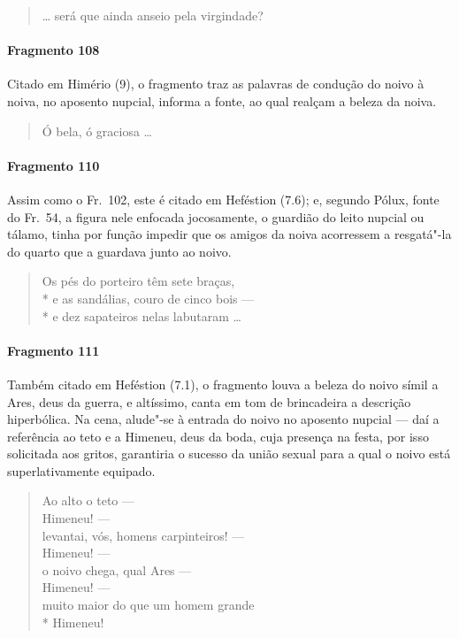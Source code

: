 \begin{verse}
\ldots{} será que ainda anseio pela virgindade?
\end{verse}

\paragraph{Fragmento 108}

{\small Citado em Himério (9), o fragmento traz as palavras de condução do noivo à noiva, no aposento nupcial, informa a fonte, ao qual realçam a beleza da noiva.}

\begin{verse}
Ó bela, ó graciosa \ldots{}
\end{verse}

\paragraph{Fragmento 110}

{\small Assim como o Fr.~102, este é citado em Heféstion (7.6); e, segundo Pólux, fonte do Fr.~54, a figura nele enfocada jocosamente, o guardião do leito nupcial ou tálamo,
tinha por função impedir que os amigos da noiva acorressem a resgatá"-la do
quarto que a guardava junto ao noivo.}

\begin{verse}
Os pés do porteiro têm sete braças,\\*
e as sandálias, couro de cinco bois --- \\*
e dez sapateiros nelas labutaram \ldots{}
\end{verse}

\paragraph{Fragmento 111}

{\small Também citado em Heféstion (7.1), o fragmento louva a beleza do noivo símil a Ares,
deus da guerra, e altíssimo, canta em tom de brincadeira a descrição
hiperbólica. Na cena, alude"-se à entrada do noivo no aposento nupcial --- daí a
referência ao teto e a Himeneu, deus da boda, cuja presença na festa, por isso
solicitada aos gritos, garantiria o sucesso da união sexual para a qual o noivo está superlativamente equipado.}

\begin{verse}
Ao alto o teto --- \\
Himeneu! --- \\
levantai, vós, homens carpinteiros! --- \\
Himeneu! --- \\
o noivo chega, qual Ares --- \\
Himeneu! --- \\
muito maior do que um homem grande\\*
Himeneu!
\end{verse}

